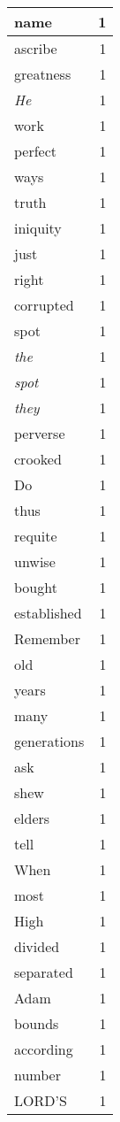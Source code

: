 \begin{center}
\begin{longtable}{l|r}
name & 1 \\ \hline
ascribe & 1 \\ \hline
greatness & 1 \\ \hline
\emph{He} & 1 \\ \hline
work & 1 \\ \hline
perfect & 1 \\ \hline
ways & 1 \\ \hline
truth & 1 \\ \hline
iniquity & 1 \\ \hline
just & 1 \\ \hline
right & 1 \\ \hline
corrupted & 1 \\ \hline
spot & 1 \\ \hline
\emph{the} & 1 \\ \hline
\emph{spot} & 1 \\ \hline
\emph{they} & 1 \\ \hline
perverse & 1 \\ \hline
crooked & 1 \\ \hline
Do & 1 \\ \hline
thus & 1 \\ \hline
requite & 1 \\ \hline
unwise & 1 \\ \hline
bought & 1 \\ \hline
established & 1 \\ \hline
Remember & 1 \\ \hline
old & 1 \\ \hline
years & 1 \\ \hline
many & 1 \\ \hline
generations & 1 \\ \hline
ask & 1 \\ \hline
shew & 1 \\ \hline
elders & 1 \\ \hline
tell & 1 \\ \hline
When & 1 \\ \hline
most & 1 \\ \hline
High & 1 \\ \hline
divided & 1 \\ \hline
separated & 1 \\ \hline
Adam & 1 \\ \hline
bounds & 1 \\ \hline
according & 1 \\ \hline
number & 1 \\ \hline
LORD'S & 1 \\ \hline

\end{longtable}
\end{center}
